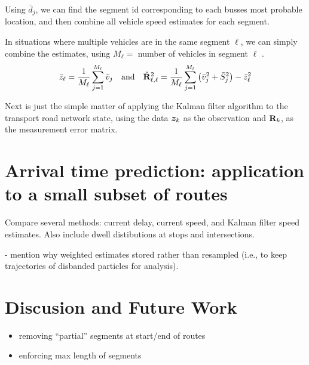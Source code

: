 \documentclass[draftcls,a4paper,onecolumn]{IEEEtran}\usepackage[]{graphicx}\usepackage[]{color}
\begin{document}
Using $\bar d_j$, we can find the segment id corresponding to each busses most probable location,
and then combine all vehicle speed estimates for each segment.

In situations where multiple vehicles are in the same segment $\ell$, 
we can simply combine the estimates, using $M_\ell = $ number of vehicles in segment $\ell$ 
\cite{cn}.
\begin{equation}
  \label{eq:kf_data_estimates}
  \bar z_\ell = \frac{1}{M_\ell} \sum_{j = 1}^{M_\ell} \bar v_j \quad\text{and}\quad
  \hat {\mathbf{R}}_{\ell,\ell}^2 = \frac{1}{M_\ell} \sum_{j=1}^{M_\ell} \left(\bar v_j^2 + \bar S_j^2\right) - \bar z_\ell^2
\end{equation}

Next is just the simple matter of applying the Kalman filter algorithm to the transport road network state,
using the data $\boldsymbol{z}_k$ as the observation and $\mathbf{R}_k$,
as the measurement error matrix.


\section{Arrival time prediction: application to a small subset of routes}
\label{sec:results}


Compare several methods:
current delay, current speed, and Kalman filter speed estimates.
Also include dwell distibutions at stops and intersections.

- mention why weighted estimates stored rather than resampled 
(i.e., to keep trajectories of disbanded particles for analysis).



\section{Discusion and Future Work}
\label{sec:discussion}

\begin{itemize}
\item removing ``partial'' segments at start/end of routes
\item enforcing max length of segments
\end{itemize}





\end{document}

